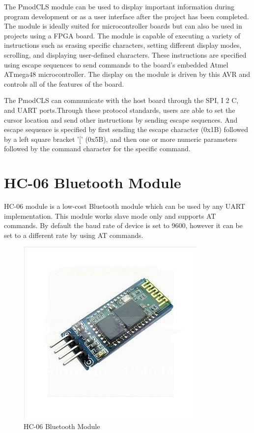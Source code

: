The PmodCLS module can be used to display important information during program development or as a user
interface after the project has been completed. The module is ideally suited for microcontroller boards but can
also be used in projects using a FPGA board.
The module is capable of executing a variety of instructions such as erasing specific characters, setting different
display modes, scrolling, and displaying user-defined characters. These instructions are specified using escape
sequences to send commands to the board’s embedded Atmel ATmega48 microcontroller. The display on the
module is driven by this AVR and controls all of the features of the board.

The PmodCLS can communicate with the host board through the SPI, I 2 C, and UART ports.Through these protocol standards, users are able to set the cursor location and send other instructions by sending
escape sequences. And escape sequence is specified by first sending the escape character (0x1B) followed by a left square bracket '[' (0x5B), and then one or more numeric parameters followed by the command character for the specific command.

\section{HC-06 Bluetooth Module}

HC-06 module is a low-cost Bluetooth module which can be used by any UART implementation. This module works slave mode only and supports AT commands. By default the baud rate of device is set to 9600, however it can be set to a different rate by using AT commands.

\begin{figure}
	\centering
	\includegraphics[scale= 0.6]{images/hc-06.jpg}
	\caption{HC-06 Bluetooth Module}
\end{figure}

